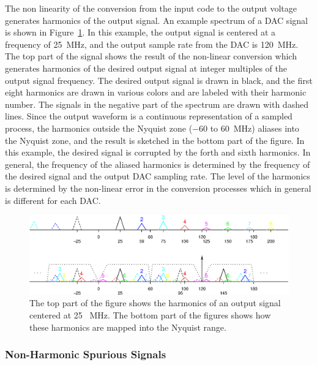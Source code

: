 \documentclass[12pt,letterpaper]{article}
\begin{document}
The non linearity of the conversion from the input code to the output
voltage generates harmonics of the output signal. An example spectrum
of a DAC signal is shown in Figure~\ref{fig:dac_harmonics}. In this
example, the output signal is centered at a frequency of 25~MHz, and
the output sample rate from the DAC is 120~MHz. The top part of the
signal shows the result of the non-linear conversion which generates
harmonics of the desired output signal at integer multiples of the
output signal frequency. The desired output signal is drawn in black,
and the first eight harmonics are drawn in various colors and are
labeled with their harmonic number. The signals in the negative part
of the spectrum are drawn with dashed lines. Since the output waveform
is a continuous representation of a sampled process, the harmonics
outside the Nyquist zone ($-$60 to 60~MHz) aliases into the Nyquist
zone, and the result is sketched in the bottom part of the figure. In
this example, the desired signal is corrupted by the forth and sixth
harmonics. In general, the frequency of the aliased harmonics is
determined by the frequency of the desired signal and the output DAC
sampling rate. The level of the harmonics is determined by the
non-linear error in the conversion processes which in general is
different for each DAC.

\begin{figure}[htbp]
  \centering
  \includegraphics[scale=0.9]{dac_spectrum.eps}
  \caption{The top part of the figure shows the harmonics of an output
    signal centered at 25 ~MHz. The bottom part of the figures shows
    how these harmonics are mapped into the Nyquist range.}
  \label{fig:dac_harmonics}
\end{figure}

\subsubsection{Non-Harmonic Spurious Signals}
\label{sec:non-harmonic_spurious}
\end{document}
